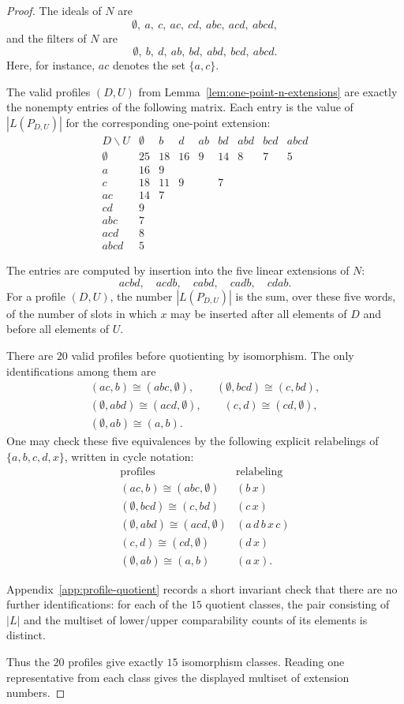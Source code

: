 \begin{proof}
The ideals of $N$ are
\[
\emptyset,\ a,\ c,\ ac,\ cd,\ abc,\ acd,\ abcd,
\]
and the filters of $N$ are
\[
\emptyset,\ b,\ d,\ ab,\ bd,\ abd,\ bcd,\ abcd.
\]
Here, for instance, $ac$ denotes the set $\{a,c\}$.

The valid profiles $(D,U)$ from Lemma~\ref{lem:one-point-n-extensions}
are exactly the nonempty entries of the following matrix.  Each entry is
the value of $|L(P_{D,U})|$ for the corresponding one-point extension:
\[
\begin{array}{c|cccccccc}
D\backslash U
&\emptyset& b& d& ab& bd& abd& bcd& abcd\\
\hline
\emptyset &25&18&16&9&14&8&7&5\\
a         &16&9&&&&&&\\
c         &18&11&9&&7&&&\\
ac        &14&7&&&&&&\\
cd        &9&&&&&&&\\
abc       &7&&&&&&&\\
acd       &8&&&&&&&\\
abcd      &5&&&&&&&
\end{array}
\]

The entries are computed by insertion into the five linear extensions of
$N$:
\[
        acbd,\quad acdb,\quad cabd,\quad cadb,\quad cdab.
\]
For a profile $(D,U)$, the number $|L(P_{D,U})|$ is the sum, over these
five words, of the number of slots in which $x$ may be inserted after all
elements of $D$ and before all elements of $U$.

There are $20$ valid profiles before quotienting by isomorphism.  The only
identifications among them are
\[
\begin{gathered}
(ac,b)\cong(abc,\emptyset),\qquad
(\emptyset,bcd)\cong(c,bd),\\
(\emptyset,abd)\cong(acd,\emptyset),\qquad
(c,d)\cong(cd,\emptyset),\\
(\emptyset,ab)\cong(a,b).
\end{gathered}
\]
One may check these five equivalences by the following explicit relabelings
of $\{a,b,c,d,x\}$, written in cycle notation:
\[
\begin{array}{c|c}
\text{profiles} & \text{relabeling}\\
\hline
(ac,b)\cong(abc,\emptyset) & (b\,x)\\
(\emptyset,bcd)\cong(c,bd) & (c\,x)\\
(\emptyset,abd)\cong(acd,\emptyset) & (a\,d\,b\,x\,c)\\
(c,d)\cong(cd,\emptyset) & (d\,x)\\
(\emptyset,ab)\cong(a,b) & (a\,x).
\end{array}
\]

Appendix~\ref{app:profile-quotient} records a short invariant check that
there are no further identifications: for each of the $15$ quotient
classes, the pair consisting of $|L|$ and the multiset of lower/upper
comparability counts of its elements is distinct.

Thus the $20$ profiles give exactly $15$ isomorphism classes.  Reading one
representative from each class gives the displayed multiset of extension
numbers.
\end{proof}

